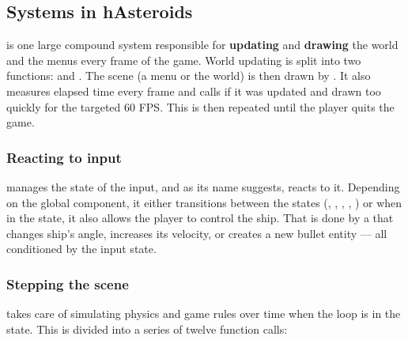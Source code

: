 \documentclass[
  digital, %
  color,   %
  table,   %
  oneside, %
  lof,     %
  lot,     %
]{fithesis3}
\begin{document}
\subsection{Systems in hAsteroids}

 is one large compound system responsible for \textbf{updating} and \textbf{drawing}
the world and the menus every frame of the game. World updating is split
into two functions:  and .
The scene (a menu or the world) is then drawn by .
It also measures elapsed time every frame and calls  if it was
updated and drawn too quickly for the targeted 60 FPS.
This is then repeated until the player quits the game.

\subsubsection{\textbf{Reacting to input}}
 manages the state of the input, and as its name suggests,
reacts to it. Depending on the global  component,
it either transitions between the states (, ,
, , ) or
when in the  state, it also allows the player to control the ship.
That is done by a  that changes ship's angle,
increases its velocity, or creates a new bullet entity --- all conditioned by the input state.

\subsubsection{\textbf{Stepping the scene}}
 takes care of simulating physics and game rules
over time when the loop is in the  state.
This is divided into a series of twelve function calls:
\end{document}
